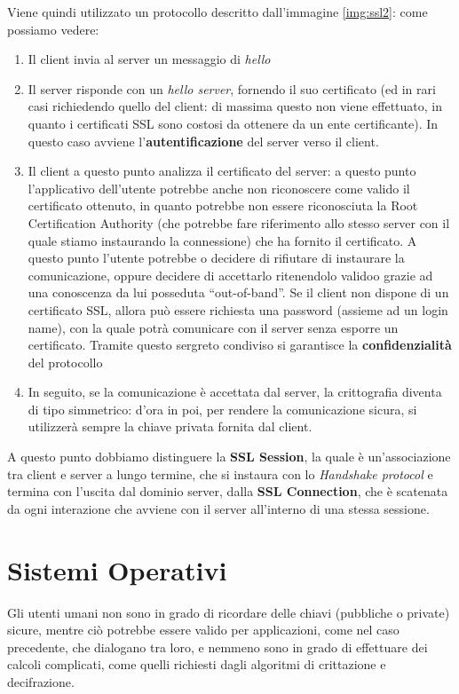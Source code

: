 Viene quindi utilizzato un protocollo descritto dall'immagine \vref{img:ssl2}:
come possiamo vedere:
\begin{enumerate}
\item Il client invia al server un messaggio di \textit{hello}
\item Il server risponde con un \textit{hello server}, fornendo il suo certificato
	(ed in rari casi richiedendo quello del client: di massima 
	questo non viene effettuato, in quanto i certificati SSL sono costosi
	da ottenere da un ente certificante). In questo caso avviene
	l'\textbf{autentificazione} del server verso il client.
\item Il client a questo punto analizza il certificato del server: a questo
	punto l'applicativo dell'utente potrebbe anche non riconoscere come
	valido il certificato ottenuto, in quanto potrebbe non essere riconosciuta
	la Root Certification Authority (che potrebbe fare riferimento allo 
	stesso server con il quale stiamo instaurando la connessione) che ha
	fornito il certificato. A questo punto l'utente potrebbe o decidere di
	rifiutare di instaurare la comunicazione, oppure decidere di accettarlo
	ritenendolo validoo grazie
	ad una conoscenza da lui posseduta ``out-of-band''.  Se il client non
	dispone di un certificato SSL, allora può essere richiesta una password
	(assieme ad un login name),
	con la quale potrà comunicare con il server senza esporre un certificato.
	Tramite questo sergreto condiviso si garantisce la \textbf{confidenzialità}
	del protocollo
\item In seguito, se la comunicazione è accettata dal server, la crittografia diventa di tipo 
	simmetrico: d'ora in poi, per rendere la comunicazione sicura, si 
	utilizzerà sempre la chiave privata fornita dal client.
\end{enumerate}

A questo punto dobbiamo distinguere la \textbf{SSL Session}, la quale è un'associazione
tra client e server a lungo termine, che si instaura con lo \textit{Handshake protocol}
e termina con l'uscita dal dominio server, dalla \textbf{SSL Connection}, che è 
scatenata da ogni interazione che avviene con il server all'interno di una stessa
sessione.

\section{Sistemi Operativi}
Gli utenti umani non sono in grado di ricordare delle chiavi (pubbliche o
private) sicure, mentre ciò potrebbe essere valido per applicazioni, come nel
caso precedente, che dialogano tra loro, e nemmeno sono in grado di effettuare
dei calcoli complicati, come quelli richiesti dagli algoritmi di crittazione e
decifrazione. 

